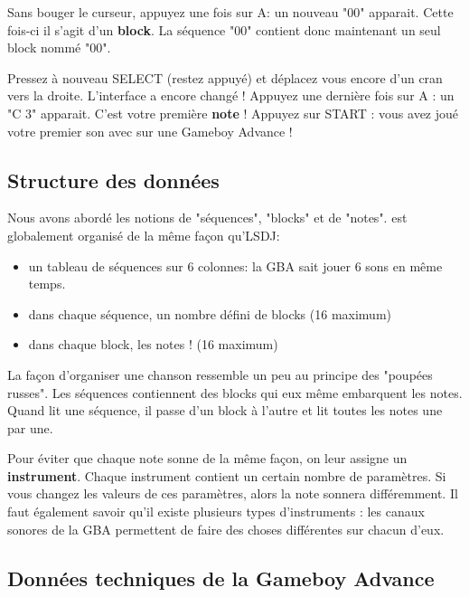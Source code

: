 
Sans bouger le curseur, appuyez une fois sur A: un nouveau "00" apparait.
Cette fois-ci il s'agit d'un {\bf block}. La séquence "00" contient donc maintenant un seul block nommé "00".


Pressez à nouveau SELECT (restez appuyé) et déplacez vous encore d'un cran vers la droite.
L'interface a encore changé !
Appuyez une dernière fois sur A : un "C 3" apparait.
C'est votre première {\bf note} !
Appuyez sur START : vous avez joué votre premier son avec \FAT sur une Gameboy Advance !


\subsection{Structure des données}

Nous avons abordé les notions de "séquences", "blocks" et de "notes".
\FAT est globalement organisé de la même façon qu'LSDJ:
\medskip

\begin{itemize}
  \item{un tableau de séquences sur 6 colonnes: la GBA sait jouer 6 sons en même temps.}
  \item{dans chaque séquence, un nombre défini de blocks (16 maximum)}
  \item{dans chaque block, les notes ! (16 maximum)}
\end{itemize}
\medskip

La façon d'organiser une chanson ressemble un peu au principe des "poupées russes".
Les séquences contiennent des blocks qui eux même embarquent les notes.
Quand \FAT lit une séquence, il passe d'un block à l'autre et lit toutes les notes une par une.
\medskip

Pour éviter que chaque note sonne de la même façon, on leur assigne un {\bf instrument}.
Chaque instrument contient un certain nombre de paramètres.
Si vous changez les valeurs de ces paramètres, alors la note sonnera différemment.
Il faut également savoir qu'il existe plusieurs types d'instruments : les canaux sonores de la GBA permettent de faire des choses différentes sur chacun d'eux.

\subsection{Données techniques de la Gameboy Advance}

